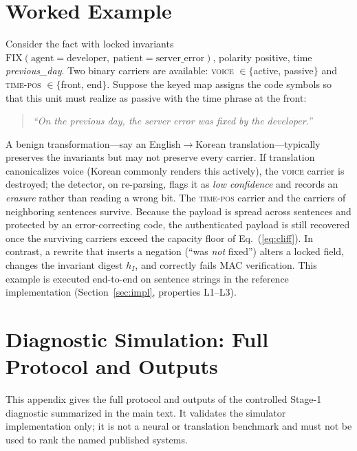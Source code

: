 \documentclass[journal]{IEEEtran}
\begin{document}
\section{Worked Example}
\label{sec:worked}
Consider the fact with locked invariants
$\mathrm{FIX}(\text{agent}{=}\text{developer},\ \text{patient}{=}\text{server\_error})$,
polarity positive, time \emph{previous\_day}. Two binary carriers are
available: \textsc{voice} $\in\{$active, passive$\}$ and \textsc{time-pos}
$\in\{$front, end$\}$. Suppose the keyed map assigns the code symbols so that
this unit must realize as passive with the time phrase at the front:
\begin{quote}\itshape
``On the previous day, the server error was fixed by the developer.''
\end{quote}
A benign transformation---say an English$\to$Korean translation---typically
preserves the invariants but may not preserve every carrier. If translation
canonicalizes voice (Korean commonly renders this actively), the \textsc{voice}
carrier is destroyed; the detector, on re-parsing, flags it as \emph{low
confidence} and records an \emph{erasure} rather than reading a wrong bit. The
\textsc{time-pos} carrier and the carriers of neighboring sentences survive.
Because the payload is spread across sentences and protected by an
error-correcting code, the authenticated payload is still recovered once the
surviving carriers exceed the capacity floor of Eq.~(\ref{eq:cliff}). In
contrast, a rewrite that inserts a negation (``was \emph{not} fixed'') alters a
locked field, changes the invariant digest $h_I$, and correctly fails MAC
verification. This example is executed end-to-end on sentence strings in the
reference implementation (Section~\ref{sec:impl}, properties L1--L3).

\section{Diagnostic Simulation: Full Protocol and Outputs}
\label{app:diagnostic}
This appendix gives the full protocol and outputs of the controlled
Stage-1 diagnostic summarized in the main text. It validates the simulator
implementation only; it is not a neural or translation benchmark and must
not be used to rank the named published systems.
\end{document}
